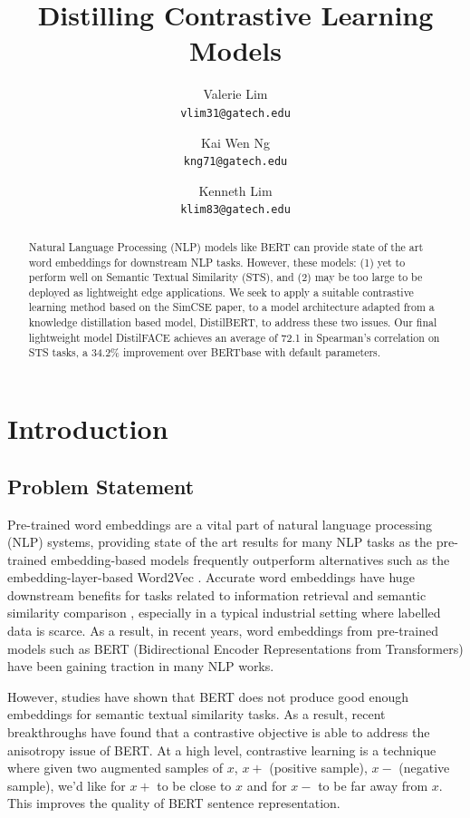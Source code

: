 \documentclass[10pt,twocolumn,letterpaper]{article}
\title{\vspace{-2.0cm}Distilling Contrastive Learning Models}
\author{
Valerie Lim \\ {\tt\small vlim31@gatech.edu}
\and
Kai Wen Ng \\ {\tt\small kng71@gatech.edu}
\and
Kenneth Lim \\ {\tt\small klim83@gatech.edu}
}
\date{\vspace{-5ex}}
\begin{document}
\maketitle

\begin{abstract}
    Natural Language Processing (NLP) models like BERT can provide state of the art word embeddings for downstream NLP tasks. However, these models: (1) yet to perform well on Semantic Textual Similarity (STS), and (2) may be too large to be deployed as lightweight edge applications. We seek to apply a suitable contrastive learning method based on the SimCSE paper, to a model architecture adapted from a knowledge distillation based model, DistilBERT, to address these two issues. Our final lightweight model DistilFACE achieves an average of 72.1 in Spearman’s correlation on STS tasks, a 34.2\% improvement over BERTbase with default parameters.
\end{abstract}


\section{Introduction}

\subsection{Problem Statement}

Pre-trained word embeddings are a vital part of natural language processing (NLP) systems, providing state of the art results for many NLP tasks  as the pre-trained embedding-based models frequently outperform alternatives such as the embedding-layer-based Word2Vec \cite{farahmand}. Accurate word embeddings have huge downstream benefits for tasks related to information retrieval and semantic similarity comparison \cite{2105.11741}, especially in a typical industrial setting where labelled data is scarce. As a result, in recent years, word embeddings from pre-trained models such as BERT (Bidirectional Encoder Representations from Transformers) have been gaining traction in many NLP works.

However, studies \cite{2104.08821} \cite{2105.11741} have shown that BERT does not produce good enough embeddings for semantic textual similarity tasks. As a result, recent breakthroughs \cite{2104.08821} \cite{1907.11692} have found that a contrastive objective is able to address the anisotropy issue of BERT. At a high level, contrastive learning is a technique where given two augmented samples of \(x\), \(x+\) (positive sample), \(x-\) (negative sample), we'd like for \(x+\) to be close to \(x\) and for \(x-\) to be far away from \(x\). This improves the quality of BERT sentence representation. 
\end{document}
